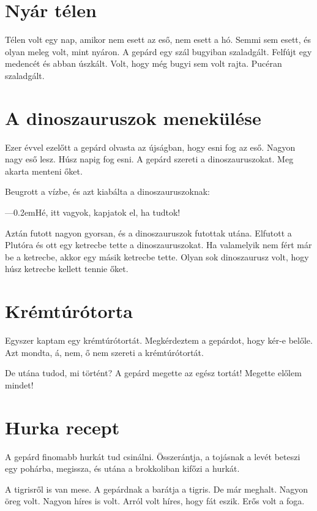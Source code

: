 \documentclass[12pt]{memoir}
\def\dash{---\kern 0.2em}
\begin{document}
\section*{Nyár télen}
Télen volt egy nap, amikor nem esett az eső, nem esett a hó. Semmi sem esett,
és olyan meleg volt, mint nyáron. A gepárd egy szál bugyiban szaladgált.
Felfújt egy medencét és abban úszkált. Volt, hogy még bugyi sem volt rajta.
Pucéran szaladgált.


\section*{A dinoszauruszok menekülése}
Ezer évvel ezelőtt a gepárd olvasta az újságban, hogy esni fog az eső. Nagyon
nagy eső lesz. Húsz napig fog esni. A gepárd szereti a dinoszauruszokat. Meg
akarta menteni őket.

Beugrott a vízbe, és azt kiabálta a dinoszauruszoknak:

\dash Hé, itt vagyok, kapjatok el, ha tudtok!

Aztán futott nagyon gyorsan, és a dinoszauruszok futottak utána.  Elfutott a
Plutóra és ott egy ketrecbe tette a dinoszauruszokat. Ha valamelyik nem fért
már be a ketrecbe, akkor egy másik ketrecbe tette. Olyan sok dinoszaurusz volt,
hogy húsz ketrecbe kellett tennie őket.


\section*{Krémtúrótorta}
Egyszer kaptam egy krémtúrótortát. Megkérdeztem a gepárdot, hogy kér-e belőle.
Azt mondta, á, nem, ő nem szereti a krémtúrótortát.

De utána tudod, mi történt? A gepárd megette az egész tortát! Megette előlem
mindet!


\section*{Hurka recept}
A gepárd finomabb hurkát tud csinálni. Összerántja, a tojásnak a levét beteszi
egy pohárba, megissza, és utána a brokkoliban kifőzi a hurkát.

A tigrisről is van mese. A gepárdnak a barátja a tigris. De már meghalt. Nagyon
öreg volt. Nagyon híres is volt. Arról volt híres, hogy fát eszik. Erős volt a
foga.


\cleartoverso \cleartorecto
\end{document}
